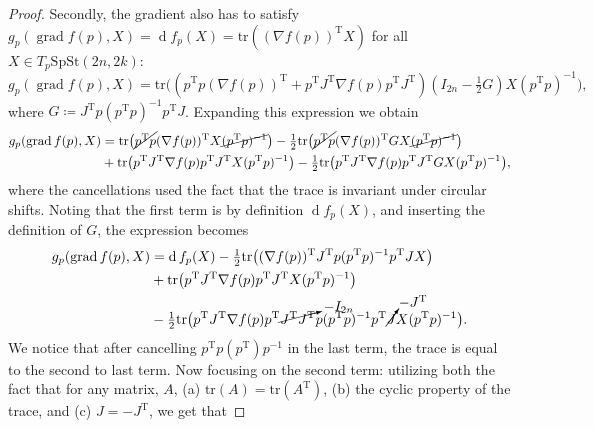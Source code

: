 \begin{proof}
    Secondly, the gradient also has to satisfy $g_{p}(\operatorname{grad}f(p),X)=\operatorname{d}f_p(X)=\mathrm{tr}((\nabla f(p))^\mathrm{T}X)$ for all $X\in T_{p}\mathrm{SpSt}(2n, 2k)$:
    \begin{equation}
        g_{p}(\operatorname{grad}f(p),X)=\mathrm{tr}\big((p^{\mathrm{T}}p (\nabla f(p))^{\mathrm{T}}+p ^{\mathrm{T}}J ^{\mathrm{T}}\nabla f(p)p ^{\mathrm{T}}J ^{\mathrm{T}})(I_{2n}- \tfrac{1}{2}G)X(p ^{\mathrm{T}}p)^{-1}\big),
    \end{equation}
    where $G \coloneqq J ^{\mathrm{T}}p(p ^{\mathrm{T}}p)^{-1}p ^{\mathrm{T}}J$. Expanding this expression we obtain
    \begin{equation}
        \begin{split}
        g_{p}(\operatorname{grad}f(p),X)&=\mathrm{tr}\big(\cancel{p ^{\mathrm{T}}p}(\nabla f(p)) ^{\mathrm{T}}X\cancel{(p ^{\mathrm{T}}p)^{-1}}\big)- \tfrac{1}{2}\mathrm{tr}\big(\cancel{p ^{\mathrm{T}}p}(\nabla f(p)) ^{\mathrm{T}}GX\cancel{(p ^{\mathrm{T}}p)^{-1}}\big)\\
        &+\mathrm{tr}\big(p ^{\mathrm{T}}J ^{\mathrm{T}} \nabla f(p)p ^{\mathrm{T}}J ^{\mathrm{T}}X (p ^{\mathrm{T}}p)^{-1}\big)- \tfrac{1}{2}\mathrm{tr}\big(p ^{\mathrm{T}}J ^{\mathrm{T}}\nabla f(p)p ^{\mathrm{T}}J ^{\mathrm{T}}GX(p ^{\mathrm{T}}p)^{-1}\big),
        \end{split}
    \end{equation}
    where the cancellations used the fact that the trace is invariant under circular shifts. Noting that the first term is by definition $\operatorname{d}f_{p}(X)$, and inserting the definition of $G$, the expression becomes
    \begin{equation}
        \begin{split}
        g_{p}(\operatorname{grad}f(p),X)&=\operatorname{d}f_{p}(X)- \tfrac{1}{2} \mathrm{tr}\big((\nabla f(p)) ^{\mathrm{T}}J ^{\mathrm{T}}p(p ^{\mathrm{T}}p)^{-1}p ^{\mathrm{T}}JX\big)\\
        &+\mathrm{tr}\big(p ^{\mathrm{T}}J ^{\mathrm{T}}\nabla f(p) p ^{\mathrm{T}}J ^{\mathrm{T}}X(p ^{\mathrm{T}}p)^{-1}\big)\\
        &- \tfrac{1}{2} \mathrm{tr}\big(p ^{\mathrm{T}}J ^{\mathrm{T}}\nabla f(p)p ^{\mathrm{T}}\cancelto{-I_{2n}}{J ^{\mathrm{T}}J ^{\mathrm{T}}}p(p ^{\mathrm{T}}p)^{-1}p ^{\mathrm{T}}\cancelto{-J ^{\mathrm{T}}}{J}X(p ^{\mathrm{T}}p)^{-1}\big).
        \end{split}
    \end{equation}
    We notice that after cancelling $p ^{\mathrm{T}}p(p ^{\mathrm{T}})p^{-1}$ in the last term, the trace is equal to the second to last term. Now focusing on the second term: utilizing both the fact that for any matrix, $A$, (a) $\mathrm{tr}(A)=\mathrm{tr}(A ^{\mathrm{T}})$, (b) the cyclic property of the trace, and (c) $J=-J ^{\mathrm{T}}$, we get that 

\end{proof}
